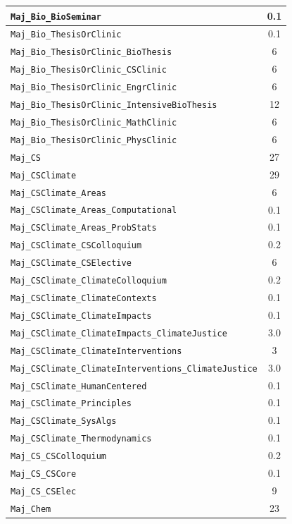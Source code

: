 \begin{longtable}{|p{}|c|}
    \verb|Maj_Bio_BioSeminar| & 0.1\\\hline
    \verb|Maj_Bio_ThesisOrClinic| & 0.1\\\hline
    \verb|Maj_Bio_ThesisOrClinic_BioThesis| & 6\\\hline
    \verb|Maj_Bio_ThesisOrClinic_CSClinic| & 6\\\hline
    \verb|Maj_Bio_ThesisOrClinic_EngrClinic| & 6\\\hline
    \verb|Maj_Bio_ThesisOrClinic_IntensiveBioThesis| & 12\\\hline
    \verb|Maj_Bio_ThesisOrClinic_MathClinic| & 6\\\hline
    \verb|Maj_Bio_ThesisOrClinic_PhysClinic| & 6\\\hline
    \verb|Maj_CS| & 27\\\hline
    \verb|Maj_CSClimate| & 29\\\hline
    \verb|Maj_CSClimate_Areas| & 6\\\hline
    \verb|Maj_CSClimate_Areas_Computational| & 0.1\\\hline
    \verb|Maj_CSClimate_Areas_ProbStats| & 0.1\\\hline
    \verb|Maj_CSClimate_CSColloquium| & 0.2\\\hline
    \verb|Maj_CSClimate_CSElective| & 6\\\hline
    \verb|Maj_CSClimate_ClimateColloquium| & 0.2\\\hline
    \verb|Maj_CSClimate_ClimateContexts| & 0.1\\\hline
    \verb|Maj_CSClimate_ClimateImpacts| & 0.1\\\hline
    \verb|Maj_CSClimate_ClimateImpacts_ClimateJustice| & 3.0\\\hline
    \verb|Maj_CSClimate_ClimateInterventions| & 3\\\hline
    \verb|Maj_CSClimate_ClimateInterventions_ClimateJustice| & 3.0\\\hline
    \verb|Maj_CSClimate_HumanCentered| & 0.1\\\hline
    \verb|Maj_CSClimate_Principles| & 0.1\\\hline
    \verb|Maj_CSClimate_SysAlgs| & 0.1\\\hline
    \verb|Maj_CSClimate_Thermodynamics| & 0.1\\\hline
    \verb|Maj_CS_CSColloquium| & 0.2\\\hline
    \verb|Maj_CS_CSCore| & 0.1\\\hline
    \verb|Maj_CS_CSElec| & 9\\\hline
    \verb|Maj_Chem| & 23\\\hline

\end{longtable}
